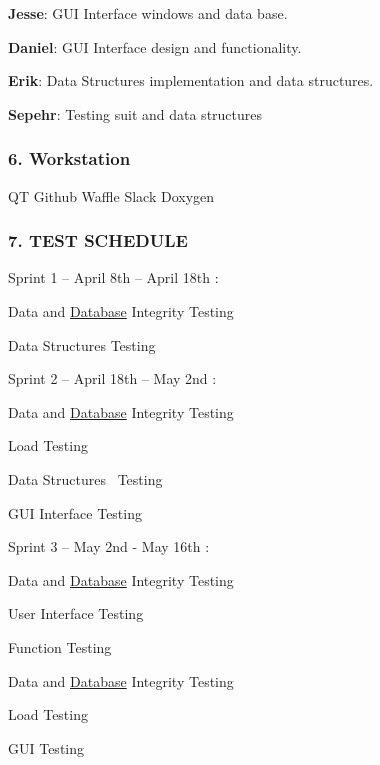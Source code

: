 {\bfseries Jesse}\+: G\+UI Interface windows and data base.

{\bfseries Daniel}\+: G\+UI Interface design and functionality.

{\bfseries Erik}\+: Data Structures implementation and data structures.

{\bfseries Sepehr}\+: Testing suit and data structures

\subsubsection*{6. Workstation}

QT Github Waffle Slack Doxygen

\subsubsection*{7. T\+E\+ST S\+C\+H\+E\+D\+U\+LE}

Sprint 1 – April 8th – April 18th \+:


\begin{DoxyItemize}
\item Data and \hyperlink{class_database}{Database} Integrity Testing
\item Data Structures Testing
\end{DoxyItemize}

Sprint 2 – April 18th – May 2nd \+:


\begin{DoxyItemize}
\item Data and \hyperlink{class_database}{Database} Integrity Testing
\item Load Testing
\item Data Structures  \+Testing
\item G\+UI Interface Testing
\end{DoxyItemize}

Sprint 3 – May 2nd -\/ May 16th \+:


\begin{DoxyItemize}
\item Data and \hyperlink{class_database}{Database} Integrity Testing
\item User Interface Testing
\item Function Testing
\item Data and \hyperlink{class_database}{Database} Integrity Testing
\item Load Testing
\item G\+UI Testing 
\end{DoxyItemize}